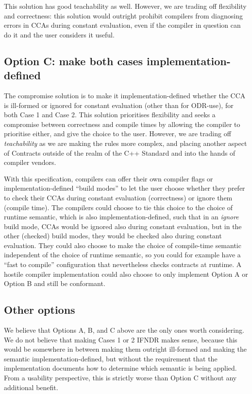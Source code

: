 This solution has good teachability as well. However, we are trading off flexibility and correctness: this solution would outright prohibit compilers from diagnosing errors in CCAs during constant evaluation, even if the compiler in question can do it and the user considers it useful.

\subsection{Option C: make both cases implementation-defined}

The compromise solution is to make it implementation-defined whether the CCA is ill-formed or ignored for constant evaluation (other than for ODR-use), for both Case 1 and Case 2. This solution prioritises flexibility and seeks a compromise between correctness and compile times by allowing the compiler to prioritise either, and give the choice to the user. However, we are trading off \emph{teachability} as we are making the rules more complex, and placing another aspect of Contracts outside of the realm of the C++ Standard and into the hands of compiler vendors.

With this specification, compilers can offer their own compiler flags or implementation-defined ``build modes'' to let the user choose whether they prefer to check their CCAs during constant evaluation (correctness) or ignore them (compile time). The compilers could choose to tie this choice to the choice of runtime semantic, which is also implementation-defined, such that in an \emph{ignore} build mode, CCAs would be ignored also during constant evaluation, but in the other (checked) build modes, they would be checked also during constant evaluation. They could also choose to make the choice of compile-time semantic independent of the choice of runtime semantic, so you could for example have a ``fast to compile'' configuration that nevertheless checks contracts at runtime. A hostile compiler implementation could also choose to only implement Option A or Option B and still be conformant.

\subsection{Other options}

We believe that Options A, B, and C above are the only ones worth considering. We do not believe that making Cases 1 or 2 IFNDR makes sense, because this would be somewhere in between making them outright ill-formed and making the semantic implementation-defined, but without the requirement that the implementation documents how to determine which semantic is being applied. From a usability perspective, this is strictly worse than Option C without any additional benefit.

